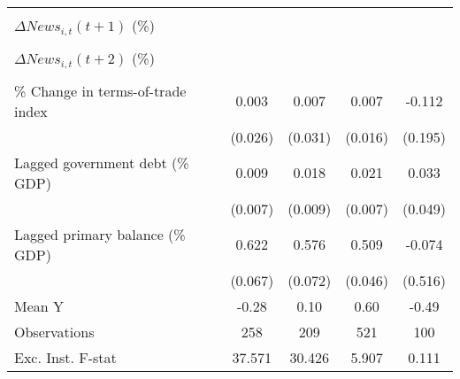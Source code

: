 {\begin{tabular}{l*{4}{c}}
                    &                     &                     &                     &                     \\
\addlinespace
$ \Delta News_{i,t}(t+1)$ (\%)&                     &                     &                     &                     \\
                    &                     &                     &                     &                     \\
\addlinespace
$ \Delta News_{i,t}(t+2)$ (\%)&                     &                     &                     &                     \\
                    &                     &                     &                     &                     \\
\addlinespace
\% Change in terms-of-trade index&       0.003         &       0.007         &       0.007         &      -0.112         \\
                    &     (0.026)         &     (0.031)         &     (0.016)         &     (0.195)         \\
\addlinespace
Lagged government debt (\% GDP)&       0.009         &       0.018\sym{*}  &       0.021\sym{***}&       0.033         \\
                    &     (0.007)         &     (0.009)         &     (0.007)         &     (0.049)         \\
\addlinespace
Lagged primary balance (\% GDP)&       0.622\sym{***}&       0.576\sym{***}&       0.509\sym{***}&      -0.074         \\
                    &     (0.067)         &     (0.072)         &     (0.046)         &     (0.516)         \\
\midrule
Mean Y              &       -0.28         &        0.10         &        0.60         &       -0.49         \\
Observations        &         258         &         209         &         521         &         100         \\
Exc. Inst. F-stat   &      37.571         &      30.426         &       5.907         &       0.111         \\
\bottomrule
\end{tabular}
}
